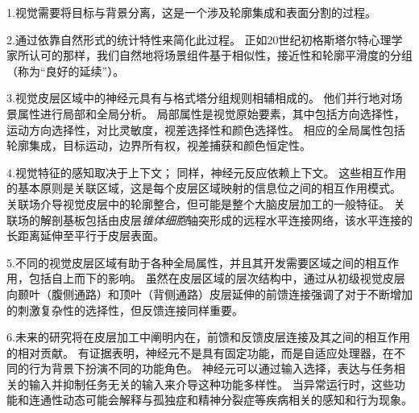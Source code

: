 1.视觉需要将目标与背景分离，这是一个涉及轮廓集成和表面分割的过程。 


2.通过依靠自然形式的统计特性来简化此过程。
正如20世纪初格斯塔尔特心理学家所认可的那样，我们自然地将场景组件基于相似性，接近性和轮廓平滑度的分组（称为“良好的延续”）。


3.视觉皮层区域中的神经元具有与格式塔分组规则相辅相成的。
他们并行地对场景属性进行局部和全局分析。
局部属性是视觉原始要素，其中包括方向选择性，运动方向选择性，对比灵敏度，视差选择性和颜色选择性。
相应的全局属性包括轮廓集成，目标运动，边界所有权，视差捕获和颜色恒定性。


4.视觉特征的感知取决于上下文；
同样，神经元反应依赖上下文。
这些相互作用的基本原则是关联区域，这是每个皮层区域映射的信息位之间的相互作用模式。
关联场介导视觉皮层中的轮廓整合，但可能是整个大脑皮层加工的一般特征。
关联场的解剖基板包括由皮层\textit{锥体细胞}轴突形成的远程水平连接网络，该水平连接的长距离延伸至平行于皮层表面。


5.不同的视觉皮层区域有助于各种全局属性，并且其开发需要区域之间的相互作用，包括自上而下的影响。
虽然在皮层区域的层次结构中，通过从初级视觉皮层向颞叶（腹侧通路）和顶叶（背侧通路）皮层延伸的前馈连接强调了对于不断增加的刺激复杂性的选择性，但反馈连接同样重要。 


6.未来的研究将在皮层加工中阐明内在，前馈和反馈皮层连接及其之间的相互作用的相对贡献。
有证据表明，神经元不是具有固定功能，而是自适应处理器，在不同的行为背景下扮演不同的功能角色。
神经元可以通过输入选择，表达与任务相关的输入并抑制任务无关的输入来介导这种功能多样性。
当异常运行时，这些功能和连通性动态可能会解释与孤独症和精神分裂症等疾病相关的感知和行为现象。

